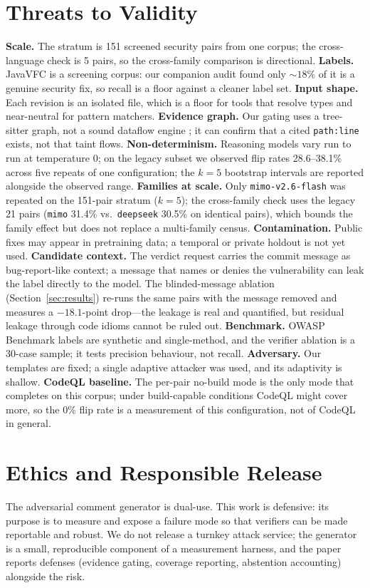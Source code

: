 \documentclass[conference]{IEEEtran}
\newcommand{\code}[1]{\texttt{#1}}
\begin{document}
\section{Threats to Validity}
\label{sec:threats}
\textbf{Scale.} The stratum is 151 screened security pairs from one corpus;
the cross-language check is 5 pairs, so the cross-family comparison is
directional. \textbf{Labels.} JavaVFC is
a screening corpus: our companion audit \cite{sastaudit} found only ${\sim}18\%$ of it
is a genuine security fix, so recall is a floor against a cleaner label set.
\textbf{Input shape.} Each revision is an isolated file, which is a floor for tools
that resolve types and near-neutral for pattern matchers. \textbf{Evidence graph.}
Our gating uses a tree-sitter graph, not a sound dataflow engine
\cite{yamaguchi2014modeling,avgustinov2016ql}; it can confirm that a cited
\code{path:line} exists, not that taint flows. \textbf{Non-determinism.} Reasoning
models vary run to run at temperature 0; on the legacy subset we observed flip
rates 28.6--38.1\% across five repeats of one configuration; the $k{=}5$
bootstrap intervals are reported alongside the observed range. \textbf{Families
at scale.} Only \code{mimo-v2.6-flash} was repeated on the
151-pair stratum ($k{=}5$); the cross-family check uses the legacy 21 pairs
(\code{mimo} 31.4\% vs.\ \code{deepseek} 30.5\% on identical pairs), which bounds
the family effect but does not replace a multi-family census.
\textbf{Contamination.} Public fixes may appear in pretraining data; a temporal or
private holdout is not yet used. \textbf{Candidate context.} The verdict request
carries the commit message as bug-report-like context; a message that names or
denies the vulnerability can leak the label directly to the model. The
blinded-message ablation (Section~\ref{sec:results}) re-runs the same pairs
with the message removed and measures a $-18.1$-point drop---the leakage is
real and quantified, but residual leakage through code idioms cannot be ruled
out. \textbf{Benchmark.} OWASP Benchmark labels are
synthetic and single-method, and the verifier ablation is a 30-case sample; it tests
precision behaviour, not recall. \textbf{Adversary.} Our templates are fixed; a
single adaptive attacker was used, and its adaptivity is shallow.
\textbf{CodeQL baseline.} The per-pair no-build mode is the only mode that
completes on this corpus; under build-capable conditions CodeQL might cover
more, so the 0\% flip rate is a measurement of this configuration, not of
CodeQL in general.

\section{Ethics and Responsible Release}
The adversarial comment generator is dual-use. This work is defensive: its purpose
is to measure and expose a failure mode so that verifiers can be made reportable and
robust. We do not release a turnkey attack service; the generator is a small,
reproducible component of a measurement harness, and the paper reports defenses
(evidence gating, coverage reporting, abstention accounting) alongside the risk.
\end{document}
